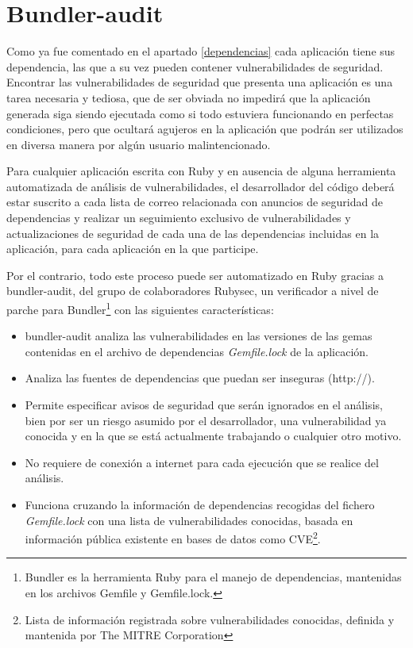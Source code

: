 

\section{Bundler-audit}

Como ya fue comentado en el apartado \ref{dependencias} cada aplicación tiene sus dependencia, las que a su vez pueden contener vulnerabilidades de seguridad. Encontrar las vulnerabilidades de seguridad que presenta una aplicación es una tarea necesaria y tediosa, que de ser obviada no impedirá que la aplicación generada siga siendo ejecutada como si todo estuviera funcionando en perfectas condiciones, pero que ocultará agujeros en la aplicación que podrán ser utilizados en diversa manera por algún usuario malintencionado.

Para cualquier aplicación escrita con Ruby y en ausencia de alguna herramienta automatizada de análisis de vulnerabilidades, el desarrollador del código deberá estar suscrito a cada lista de correo relacionada con anuncios de seguridad de dependencias y realizar un seguimiento exclusivo de vulnerabilidades y actualizaciones de seguridad de cada una de las dependencias incluidas en la aplicación, para cada aplicación en la que participe\cite{prescott2015}.

Por el contrario, todo este proceso puede ser automatizado en Ruby gracias a bundler-audit\cite{bundleaudit2017}, del grupo de colaboradores Rubysec, un verificador a nivel de parche para Bundler\footnote{Bundler es la herramienta Ruby para el manejo de dependencias, mantenidas en los archivos Gemfile y Gemfile.lock.} con las siguientes características:

\begin{itemize}
	\item bundler-audit analiza las vulnerabilidades en las versiones de las gemas contenidas en el archivo de dependencias \textit{Gemfile.lock} de la aplicación.
	\item Analiza las fuentes de dependencias que puedan ser inseguras (http://).
	\item Permite especificar avisos de seguridad que serán ignorados en el análisis, bien por ser un riesgo asumido por el desarrollador, una vulnerabilidad ya conocida y en la que se está actualmente trabajando o cualquier otro motivo.
	\item No requiere de conexión a internet para cada ejecución que se realice del análisis.
	\item Funciona cruzando la información de dependencias recogidas del fichero \textit{Gemfile.lock} con una lista de vulnerabilidades conocidas\cite{advisorydb2017}, basada en información pública existente en bases de datos como \gls{CVE}\footnote{Lista de información registrada sobre vulnerabilidades conocidas, definida y mantenida por The MITRE Corporation}.
\end{itemize}

